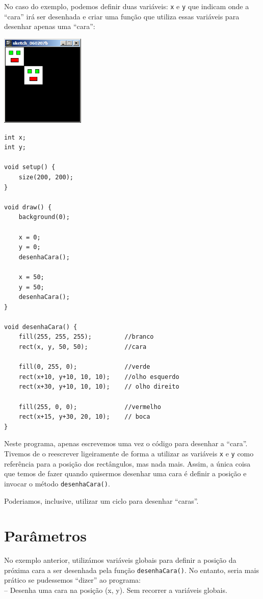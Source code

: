 No caso do exemplo, podemos definir duas variáveis: \texttt{x} e \texttt{y} que indicam onde a ``cara'' irá ser desenhada e criar uma função que utiliza essas variáveis para desenhar apenas uma ``cara'':
\begin{center}
	\includegraphics[width=4cm]{images/caraMetodo.eps}
\end{center}
\begin{lstlisting}
int x;
int y;

void setup() {
    size(200, 200);
}

void draw() {
    background(0);
    
    x = 0;
    y = 0;
    desenhaCara();
    
    x = 50;
    y = 50;     
    desenhaCara();  
}

void desenhaCara() {
    fill(255, 255, 255);         //branco
    rect(x, y, 50, 50);          //cara
    
    fill(0, 255, 0);             //verde
    rect(x+10, y+10, 10, 10);    //olho esquerdo
    rect(x+30, y+10, 10, 10);    // olho direito
    
    fill(255, 0, 0);             //vermelho
    rect(x+15, y+30, 20, 10);    // boca       
}
\end{lstlisting}
Neste programa, apenas escrevemos uma vez o código para desenhar a ``cara''. Tivemos de o reescrever ligeiramente de forma a utilizar as variáveis \texttt{x} e \texttt{y} como referência para a posição dos rectângulos, mas nada mais.
Assim, a única coisa que temos de fazer quando quisermos desenhar uma cara é definir a posição e invocar o método \texttt{desenhaCara()}.

Poderiamos, inclusive, utilizar um ciclo para desenhar ``caras''.


\section{Parâmetros}
No exemplo anterior, utilizámos variáveis globais para definir a posição da próxima cara a ser desenhada pela função \texttt{desenhaCara()}. No entanto, seria mais prático se pudessemos ``dizer'' ao programa: \\
-- Desenha uma cara na posição (x, y). Sem recorrer a variáveis globais.

